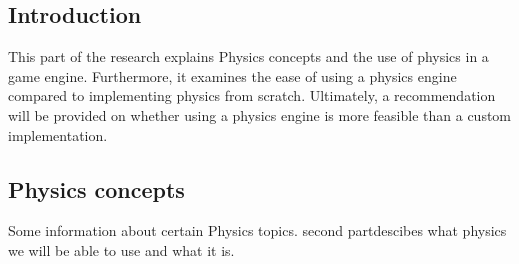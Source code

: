 \documentclass{projdoc}
\begin{document}


\subsection{Introduction}

This part of the research explains Physics concepts and the use of physics in a game
engine. Furthermore, it examines the ease of using a physics engine compared to
implementing physics from scratch. Ultimately, a recommendation will be provided on
whether using a physics engine is more feasible than a custom implementation.

\subsection{Physics concepts}

Some information about certain Physics topics. second partdescibes what physics we
will be able to use and what it is.


\end{document}
